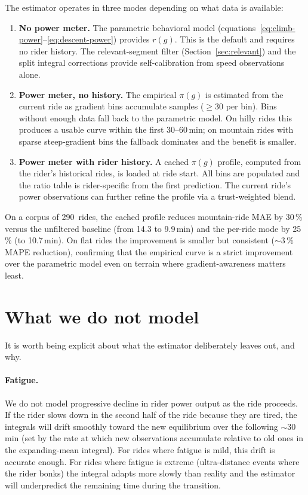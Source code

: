 \documentclass[11pt,a4paper]{article}
\begin{document}
The estimator operates in three modes depending on what data is
available:
\begin{enumerate}
\item \textbf{No power meter.}
  The parametric behavioral model
  (equations~\ref{eq:climb-power}--\ref{eq:descent-power}) provides
  $r(g)$. This is the default and requires no rider history. The
  relevant-segment filter (Section~\ref{sec:relevant}) and the
  split integral corrections provide self-calibration from speed
  observations alone.
\item \textbf{Power meter, no history.}
  The empirical $\pi(g)$ is estimated from the current ride as
  gradient bins accumulate samples ($\ge$30 per bin). Bins without
  enough data fall back to the parametric model. On hilly rides this
  produces a usable curve within the first 30--60\,\si{\minute}; on
  mountain rides with sparse steep-gradient bins the fallback
  dominates and the benefit is smaller.
\item \textbf{Power meter with rider history.}
  A cached $\pi(g)$ profile, computed from the rider's historical
  rides, is loaded at ride start. All bins are populated and the
  ratio table is rider-specific from the first prediction. The
  current ride's power observations can further refine the profile
  via a trust-weighted blend.
\end{enumerate}

On a corpus of 290~rides, the cached profile reduces mountain-ride
MAE by 30\,\% versus the unfiltered baseline (from 14.3 to
9.9\,\si{\minute}) and the per-ride mode by 25\,\% (to
10.7\,\si{\minute}). On flat rides the improvement is smaller but
consistent ($\sim$3\,\% MAPE reduction), confirming that the
empirical curve is a strict improvement over the parametric model
even on terrain where gradient-awareness matters least.


\section{What we do not model}

It is worth being explicit about what the estimator deliberately
leaves out, and why.

\paragraph{Fatigue.} We do not model progressive decline in rider
power output as the ride proceeds. If the rider slows down in the
second half of the ride because they are tired, the integrals will
drift smoothly toward the new equilibrium over the following
$\sim$30\,\si{\minute} (set by the rate at which new observations
accumulate relative to old ones in the expanding-mean integral).
For rides where fatigue is mild, this drift is accurate enough. For
rides where fatigue is extreme (ultra-distance events where the rider
bonks) the integral adapts more slowly than reality and the estimator
will underpredict the remaining time during the transition.
\end{document}
